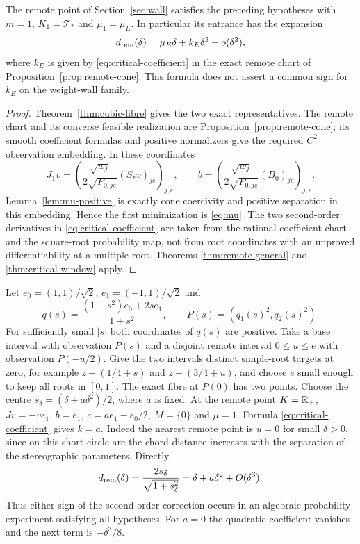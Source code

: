 \begin{corollary}\label{cor:cubic-critical}
The remote point of Section~\ref{sec:wall} satisfies the preceding
hypotheses with $m=1$, $K_1=\mathcal T_*$ and $\mu_1=\mu_E$.
In particular its entrance has the expansion
\[
 d_{\rm rem}(\delta)=\mu_E\delta+k_E\delta^2+o(\delta^2),
\]
where $k_E$ is given by \eqref{eq:critical-coefficient} in the exact
remote chart of Proposition~\ref{prop:remote-cone}. This formula does
not assert a common sign for $k_E$ on the weight-wall family.
\end{corollary}
\begin{proof}
Theorem~\ref{thm:cubic-fibre} gives the two exact representatives.
The remote chart and its converse feasible realization are
Proposition~\ref{prop:remote-cone}; its smooth coefficient formulas and
positive normalizers give the required $C^2$ observation embedding.
In these coordinates
\[
 J_1v=\left(\frac{\sqrt{w_j}}{2\sqrt{P_{0,je}}}(S_*v)_{je}\right)_{j,e},
 \qquad
 b=\left(\frac{\sqrt{w_j}}{2\sqrt{P_{0,je}}}(B_0)_{je}\right)_{j,e}.
\]
Lemma~\ref{lem:mu-positive} is exactly cone coercivity and positive
separation in this embedding. Hence the first minimization is
\eqref{eq:mu}. The two second-order derivatives in
\eqref{eq:critical-coefficient} are taken from the rational coefficient
chart and the square-root probability map, not from root coordinates
with an unproved differentiability at a multiple root. Theorems
\ref{thm:remote-general} and \ref{thm:critical-window} apply.
\end{proof}

\begin{example}\label{ex:critical-signs}
Let $e_0=(1,1)/\sqrt2$, $e_1=(-1,1)/\sqrt2$ and
\[
 q(s)=\frac{(1-s^2)e_0+2se_1}{1+s^2},\qquad
 P(s)=(q_1(s)^2,q_2(s)^2).
\]
For sufficiently small $|s|$ both coordinates of $q(s)$ are positive.
Take a base interval with observation $P(s)$ and a disjoint remote
interval $0\le u\le e$ with observation $P(-u/2)$. Give the two
intervals distinct simple-root targets at zero, for example
$z-(1/4+s)$ and $z-(3/4+u)$, and choose $e$ small enough to keep
all roots in $[0,1]$. The exact fibre at $P(0)$ has two points.
Choose the centre $s_\delta=(\delta+a\delta^2)/2$, where $a$ is fixed.
At the remote point $K=\mathbb R_+$, $Jv=-ve_1$, $b=e_1$,
$c=ae_1-e_0/2$, $M=\{0\}$ and $\mu=1$. Formula
\eqref{eq:critical-coefficient} gives $k=a$.
Indeed the nearest remote point is $u=0$ for small $\delta>0$, since
on this short circle arc the chord distance increases with the separation
of the stereographic parameters. Directly,
\[
 d_{\rm rem}(\delta)=\frac{2s_\delta}{\sqrt{1+s_\delta^2}}
                 =\delta+a\delta^2+O(\delta^3).
\]
Thus either sign of the second-order correction occurs in an algebraic
probability experiment satisfying all hypotheses. For $a=0$ the
quadratic coefficient vanishes and the next term is $-\delta^3/8$.
\end{example}

